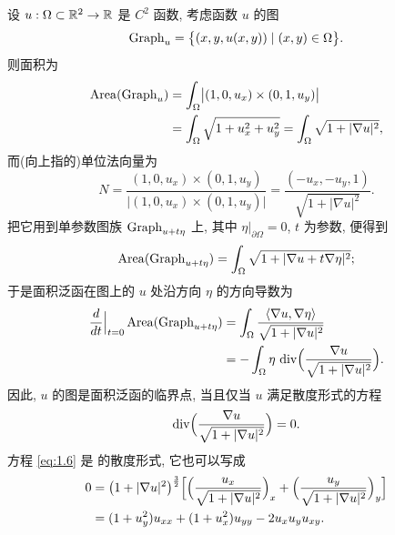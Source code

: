设 $u:\Omega\subset\mathbb{R}^2\to\mathbb{R}$ 是 $C^2$ 函数, 考虑函数 $u$ 的图
\begin{equation}
\operatorname{Graph}_u=\bigl\{(x,y,u(x,y))\mid (x,y)\in\Omega\bigr\}.
\label{eq:1.1}
\end{equation}
则面积为
\begin{align}
\operatorname{Area}(\operatorname{Graph}_u)
  &=\int_{\Omega}\bigl|(1,0,u_x)\times(0,1,u_y)\bigr| \notag\\
  &=\int_{\Omega}\sqrt{1+u_x^2+u_y^2}
   =\int_{\Omega}\sqrt{1+|\nabla u|^2},
\label{eq:1.2}
\end{align}
而(向上指的)单位法向量为
\begin{equation}
N=\frac{(1,0,u_x)\times(0,1,u_y)}
        {\bigl|(1,0,u_x)\times(0,1,u_y)\bigr|}
 =\frac{(-u_x,-u_y,1)}{\sqrt{1+|\nabla u|^2}}.
\label{eq:1.3}
\end{equation}
把它用到单参数图族 $\operatorname{Graph}_{u+t\eta}$ 上, 其中 $\eta|_{\partial\Omega}=0$,
$t$ 为参数, 便得到
\begin{equation}
\operatorname{Area}(\operatorname{Graph}_{u+t\eta})=\int_{\Omega}\sqrt{1+|\nabla u+t\nabla\eta|^2};
\label{eq:1.4}
\end{equation}
于是面积泛函在图上的 $u$ 处沿方向 $\eta$ 的方向导数为
\begin{align}
\frac{d}{dt}\Big|_{t=0}\operatorname{Area}(\operatorname{Graph}_{u+t\eta})
  &=\int_{\Omega}\frac{\langle\nabla u,\nabla\eta\rangle}
        {\sqrt{1+|\nabla u|^2}} \notag\\
  &=-\int_{\Omega}\eta\,\operatorname{div}\Bigl(\frac{\nabla u}
        {\sqrt{1+|\nabla u|^2}}\Bigr).
\label{eq:1.5}
\end{align}
因此, $u$ 的图是面积泛函的临界点, 当且仅当 $u$ 满足散度形式的方程
\begin{equation}
\operatorname{div}\Bigl(\frac{\nabla u}{\sqrt{1+|\nabla u|^2}}\Bigr)=0.
\label{eq:1.6}
\end{equation}
方程 \eqref{eq:1.6} 是
的散度形式, 它也可以写成
\begin{align}
0
 &=\bigl(1+|\nabla u|^2\bigr)^{\frac32}
   \Bigl[\Bigl(\frac{u_x}{\sqrt{1+|\nabla u|^2}}\Bigr)_x
        +\Bigl(\frac{u_y}{\sqrt{1+|\nabla u|^2}}\Bigr)_y\Bigr] \notag\\
 &=(1+u_y^2)u_{xx}+(1+u_x^2)u_{yy}-2u_xu_yu_{xy}.
\label{eq:1.7}
\end{align}

